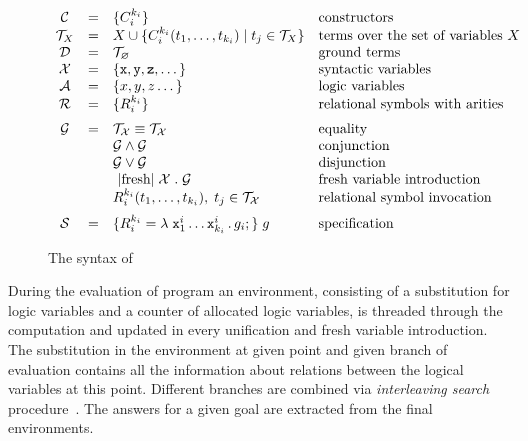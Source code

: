 \begin{figure}[t]
\centering
\[
\begin{array}{ccll}
  \mathcal{C} & = & \{C_i^{k_i}\} & \mbox{constructors} \\
  \mathcal{T}_X & = & X \cup \{C_i^{k_i} (t_1, \dots, t_{k_i}) \mid t_j\in\mathcal{T}_X\} & \mbox{terms over the set of variables $X$} \\
  \mathcal{D} & = & \mathcal{T}_\emptyset & \mbox{ground terms}\\
  \mathcal{X} & = & \{ \ttt{x}, \ttt{y}, \ttt{z}, \dots \} & \mbox{syntactic variables} \\
  \mathcal{A} & = & \{ x, y, z \dots \} & \mbox{logic variables} \\
  \mathcal{R} & = & \{ R_i^{k_i}\} &\mbox{relational symbols with arities} \\[2mm]
  \mathcal{G} & = & \mathcal{T_X}\equiv\mathcal{T_X}   &  \mbox{equality} \\
              &   & \mathcal{G}\wedge\mathcal{G}     & \mbox{conjunction} \\
              &   & \mathcal{G}\vee\mathcal{G}       &\mbox{disjunction} \\
              &   & \mbox{\lstinline|fresh|}\;\mathcal{X}\;.\;\mathcal{G} & \mbox{fresh variable introduction} \\
              &   & R_i^{k_i} (t_1,\dots,t_{k_i}),\;t_j\in\mathcal{T_X} & \mbox{relational symbol invocation} \\[2mm]
  \mathcal{S} & = & \{R_i^{k_i} = \lambda\;\ttt{x}_1^i\dots \ttt{x}_{k_i}^i\,.\, g_i;\}\; g & \mbox{specification}
\end{array}
\]
\caption{The syntax of \mK}
\label{fig:syntax}
\end{figure}

During the evaluation of \mK program an environment, consisting of a substitution for logic variables and a counter of allocated logic
variables, is threaded through the computation and updated in every unification and fresh variable introduction.
The substitution in the environment at given point and given branch of evaluation contains all the information about relations between
the logical variables at this point.
Different branches are combined via \emph{interleaving search} procedure~\cite{Transformers}.
The answers for a given goal are extracted from the final environments.

